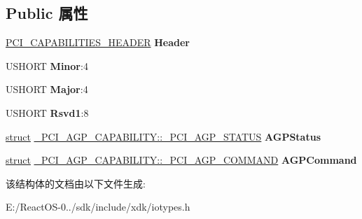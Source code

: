 \subsection*{Public 属性}
\begin{DoxyCompactItemize}
\item 
\mbox{\label{struct___p_c_i___a_g_p___c_a_p_a_b_i_l_i_t_y_ae02b1f91cec6bcaa2a516f2c134d7e7d}} 
\hyperlink{struct___p_c_i___c_a_p_a_b_i_l_i_t_i_e_s___h_e_a_d_e_r}{P\+C\+I\+\_\+\+C\+A\+P\+A\+B\+I\+L\+I\+T\+I\+E\+S\+\_\+\+H\+E\+A\+D\+ER} {\bfseries Header}
\item 
\mbox{\label{struct___p_c_i___a_g_p___c_a_p_a_b_i_l_i_t_y_afcaf393199c5b029e5210614fb2cdac1}} 
U\+S\+H\+O\+RT {\bfseries Minor}\+:4
\item 
\mbox{\label{struct___p_c_i___a_g_p___c_a_p_a_b_i_l_i_t_y_a8427962748aa8aeaaa22ed4c3ebfcbd5}} 
U\+S\+H\+O\+RT {\bfseries Major}\+:4
\item 
\mbox{\label{struct___p_c_i___a_g_p___c_a_p_a_b_i_l_i_t_y_a36c3ef08d6f01e519741d50274e0ae7d}} 
U\+S\+H\+O\+RT {\bfseries Rsvd1}\+:8
\item 
\mbox{\label{struct___p_c_i___a_g_p___c_a_p_a_b_i_l_i_t_y_a84f3d34a09e6bc385a2eab1e49e82634}} 
\hyperlink{interfacestruct}{struct} \hyperlink{struct___p_c_i___a_g_p___c_a_p_a_b_i_l_i_t_y_1_1___p_c_i___a_g_p___s_t_a_t_u_s}{\+\_\+\+P\+C\+I\+\_\+\+A\+G\+P\+\_\+\+C\+A\+P\+A\+B\+I\+L\+I\+T\+Y\+::\+\_\+\+P\+C\+I\+\_\+\+A\+G\+P\+\_\+\+S\+T\+A\+T\+US} {\bfseries A\+G\+P\+Status}
\item 
\mbox{\label{struct___p_c_i___a_g_p___c_a_p_a_b_i_l_i_t_y_ab8e46f5351166c68274216a9f4012f34}} 
\hyperlink{interfacestruct}{struct} \hyperlink{struct___p_c_i___a_g_p___c_a_p_a_b_i_l_i_t_y_1_1___p_c_i___a_g_p___c_o_m_m_a_n_d}{\+\_\+\+P\+C\+I\+\_\+\+A\+G\+P\+\_\+\+C\+A\+P\+A\+B\+I\+L\+I\+T\+Y\+::\+\_\+\+P\+C\+I\+\_\+\+A\+G\+P\+\_\+\+C\+O\+M\+M\+A\+ND} {\bfseries A\+G\+P\+Command}
\end{DoxyCompactItemize}


该结构体的文档由以下文件生成\+:\begin{DoxyCompactItemize}
\item 
E\+:/\+React\+O\+S-\/0../sdk/include/xdk/iotypes.\+h\end{DoxyCompactItemize}
